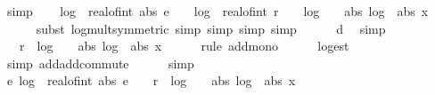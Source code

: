 \begin{isabellebody}
\ simp\isanewline
\isanewline
\ \ \isamarkupfalse%
\ {\isachardoublequoteopen}log\ {}\ {\isacharparenleft}{\kern0pt}real{\isacharunderscore}{\kern0pt}of{\isacharunderscore}{\kern0pt}int\ {\isacharparenleft}{\kern0pt}abs\ e\ {\isacharplus}{\kern0pt}\ {}{\isacharparenright}{\kern0pt}{\isacharparenright}{\kern0pt}\ {\isasymle}\ log\ {}\ {\isacharparenleft}{\kern0pt}real{\isacharunderscore}{\kern0pt}of{\isacharunderscore}{\kern0pt}int\ r\ {\isacharplus}{\kern0pt}\ {}{\isacharparenright}{\kern0pt}\ {\isacharplus}{\kern0pt}\ log\ {}\ {\isacharparenleft}{\kern0pt}{}\ {\isacharplus}{\kern0pt}\ abs\ {\isacharparenleft}{\kern0pt}log\ {}\ {\isacharparenleft}{\kern0pt}abs\ x{\isacharparenright}{\kern0pt}{\isacharparenright}{\kern0pt}{\isacharparenright}{\kern0pt}{\isachardoublequoteclose}\isanewline
\ \ \ \ \isamarkupfalse%
\ {\isacharparenleft}{\kern0pt}subst\ log{\isacharunderscore}{\kern0pt}mult{\isacharbrackleft}{\kern0pt}symmetric{\isacharbrackright}{\kern0pt}{\isacharcomma}{\kern0pt}\ simp{\isacharcomma}{\kern0pt}\ simp{\isacharcomma}{\kern0pt}\ simp{\isacharcomma}{\kern0pt}\ simp{\isacharparenright}{\kern0pt}\isanewline
\ \ \ \ \isamarkupfalse%
\ d\ \isamarkupfalse%
\ simp\isanewline
\ \ \isamarkupfalse%
\ \isamarkupfalse%
\ {\isachardoublequoteopen}{\isachardot}{\kern0pt}{\isachardot}{\kern0pt}{\isachardot}{\kern0pt}\ {\isasymle}\ r\ {\isacharplus}{\kern0pt}\ log\ {}\ {\isacharparenleft}{\kern0pt}{}\ {\isacharplus}{\kern0pt}\ abs\ {\isacharparenleft}{\kern0pt}log\ {}\ {\isacharparenleft}{\kern0pt}abs\ x{\isacharparenright}{\kern0pt}{\isacharparenright}{\kern0pt}{\isacharparenright}{\kern0pt}{\isachardoublequoteclose}\isanewline
\ \ \ \ \isamarkupfalse%
\ {\isacharparenleft}{\kern0pt}rule\ add{\isacharunderscore}{\kern0pt}mono{\isacharparenright}{\kern0pt}\isanewline
\ \ \ \ \isamarkupfalse%
\ log{\isacharunderscore}{\kern0pt}est\ \isamarkupfalse%
\ {\isacharparenleft}{\kern0pt}simp\ add{\isacharcolon}{\kern0pt}add{\isachardot}{\kern0pt}commute{\isacharparenright}{\kern0pt}\isanewline
\ \ \ \ \isamarkupfalse%
\ simp\isanewline
\ \ \isamarkupfalse%
\ \isamarkupfalse%
\ e{\isacharcolon}{\kern0pt}\ {\isachardoublequoteopen}log\ {}\ {\isacharparenleft}{\kern0pt}real{\isacharunderscore}{\kern0pt}of{\isacharunderscore}{\kern0pt}int\ {\isacharparenleft}{\kern0pt}abs\ e\ {\isacharplus}{\kern0pt}\ {}{\isacharparenright}{\kern0pt}{\isacharparenright}{\kern0pt}\ {\isasymle}\ r\ {\isacharplus}{\kern0pt}\ log\ {}\ {\isacharparenleft}{\kern0pt}{}\ {\isacharplus}{\kern0pt}\ abs\ {\isacharparenleft}{\kern0pt}log\ {}\ {\isacharparenleft}{\kern0pt}abs\ x{\isacharparenright}{\kern0pt}{\isacharparenright}{\kern0pt}{\isacharparenright}{\kern0pt}{\isachardoublequoteclose}\ \isamarkupfalse%

\end{isabellebody}
